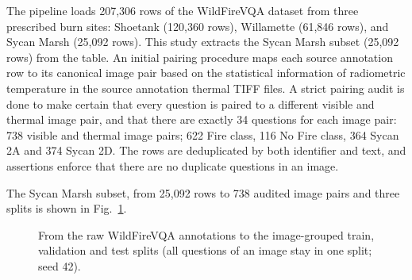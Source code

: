 \documentclass[conference]{IEEEtran}
\begin{document}
The pipeline loads 207,306 rows of the WildFireVQA dataset from three prescribed burn sites: Shoetank (120,360 rows), Willamette (61,846 rows), and Sycan Marsh (25,092 rows). This study extracts the Sycan Marsh subset (25,092 rows) from the table. An initial pairing procedure maps each source annotation row to its canonical image pair based on the statistical information of radiometric temperature in the source annotation thermal TIFF files. A strict pairing audit is done to make certain that every question is paired to a different visible and thermal image pair, and that there are exactly 34 questions for each image pair: 738 visible and thermal image pairs; 622 Fire class, 116 No Fire class, 364 Sycan 2A and 374 Sycan 2D. The rows are deduplicated by both identifier and text, and assertions enforce that there are no duplicate questions in an image.

The Sycan Marsh subset, from 25,092 rows to 738 audited image pairs and three splits is shown in Fig.~\ref{fig:funnel}.

\begin{figure}[!t]
  \centering
  \caption{From the raw WildFireVQA annotations to the image-grouped train, validation and test splits (all questions of an image stay in one split; seed 42).}
  \label{fig:funnel}
\end{figure}
\end{document}
